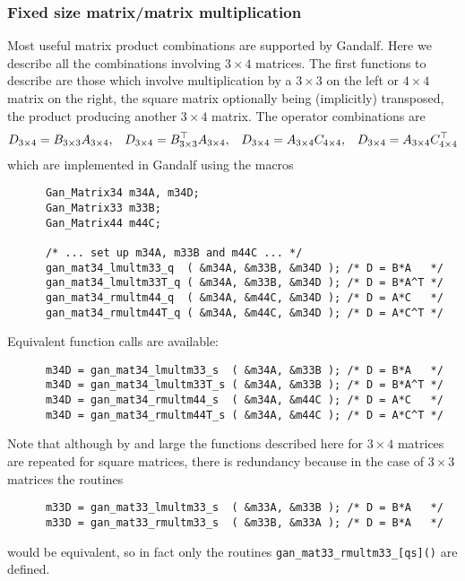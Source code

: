 \subsubsection{Fixed size matrix/matrix multiplication}
Most useful matrix product combinations are supported by Gandalf.
Here we describe all the combinations involving $3\times 4$ matrices.
The first functions to describe are those which involve multiplication
by a $3\times 3$ on the left or $4\times 4$ matrix on the right,
the square matrix optionally being (implicitly) transposed,
the product producing another $3\times 4$ matrix.
The operator combinations are
\[ D_{3\times 4} = B_{3\times 3} A_{3\times 4},\;\;\;
   D_{3\times 4} = B_{3\times 3}^{\top} A_{3\times 4},\;\;\;
   D_{3\times 4} = A_{3\times 4} C_{4\times 4},\;\;\;
   D_{3\times 4} = A_{3\times 4} C_{4\times 4}^{\top}
\]
which are implemented in Gandalf using the macros
\begin{verbatim}
      Gan_Matrix34 m34A, m34D;
      Gan_Matrix33 m33B;
      Gan_Matrix44 m44C;

      /* ... set up m34A, m33B and m44C ... */
      gan_mat34_lmultm33_q  ( &m34A, &m33B, &m34D ); /* D = B*A   */
      gan_mat34_lmultm33T_q ( &m34A, &m33B, &m34D ); /* D = B*A^T */
      gan_mat34_rmultm44_q  ( &m34A, &m44C, &m34D ); /* D = A*C   */
      gan_mat34_rmultm44T_q ( &m34A, &m44C, &m34D ); /* D = A*C^T */
\end{verbatim}
Equivalent function calls are available:
\begin{verbatim}
      m34D = gan_mat34_lmultm33_s  ( &m34A, &m33B ); /* D = B*A   */
      m34D = gan_mat34_lmultm33T_s ( &m34A, &m33B ); /* D = B*A^T */
      m34D = gan_mat34_rmultm44_s  ( &m34A, &m44C ); /* D = A*C   */
      m34D = gan_mat34_rmultm44T_s ( &m34A, &m44C ); /* D = A*C^T */
\end{verbatim}
Note that although by and large the functions described here for $3\times 4$
matrices are repeated for square matrices, there is redundancy because
in the case of $3\times 3$ matrices the routines
\begin{verbatim}
      m33D = gan_mat33_lmultm33_s  ( &m33A, &m33B ); /* D = B*A   */
      m33D = gan_mat33_rmultm33_s  ( &m33B, &m33A ); /* D = B*A   */
\end{verbatim}
would be equivalent, so in fact only the routines
{\tt gan\_mat33\_rmultm33\_[qs]()} are defined.


